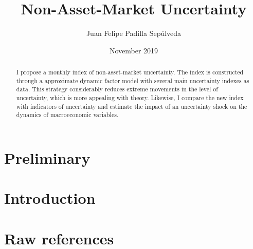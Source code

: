 \documentclass[12pt,twoside]{reedthesis}
\title{Non-Asset-Market Uncertainty}
\author{Juan Felipe Padilla Sepúlveda}
\date{November 2019}
\begin{document}
  \maketitle

\frontmatter %
\pagestyle{empty} %



  \hypersetup{linkcolor=black}
  \setcounter{tocdepth}{2}
  \tableofcontents

  \listoftables

  \listoffigures
  \begin{abstract}
    I propose a monthly index of non-asset-market uncertainty. The index is constructed through a approximate dynamic factor model with several main uncertainty indexes as data. This strategy considerably reduces extreme movements in the level of uncertainty, which is more appealing with theory. Likewise, I compare the new index with indicators of uncertainty and estimate the impact of an uncertainty shock on the dynamics of macroeconomic variables.
  \end{abstract}

\mainmatter %
\pagestyle{fancyplain} %

\hypertarget{preliminary}{%
\chapter{Preliminary}\label{preliminary}}

\hypertarget{introduction}{%
\chapter*{Introduction}\label{introduction}}

\hypertarget{raw-references}{%
\chapter{Raw references}\label{raw-references}}
\end{document}
